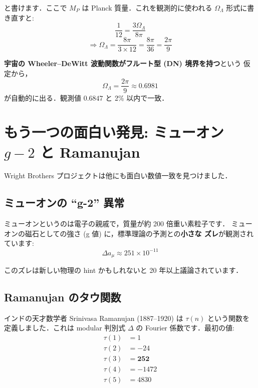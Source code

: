 \documentclass[11pt,a4paper]{article}
\begin{document}
と書けます．ここで $M_P$ は Planck 質量．これを観測的に使われる
$\Omega_\Lambda$ 形式に書き直すと:
\begin{equation*}
\frac{1}{12} = \frac{3 \Omega_\Lambda}{8\pi}
\end{equation*}
\begin{equation*}
\Longrightarrow \Omega_\Lambda = \frac{8\pi}{3 \times 12} = \frac{8\pi}{36} = \frac{2\pi}{9}
\end{equation*}

\begin{tcolorbox}[colback=green!5,colframe=green!60!black,title=導出完了]
\textbf{宇宙の Wheeler--DeWitt 波動関数がフルート型 (DN) 境界を持つ}という
仮定から，
\begin{equation*}
\boxed{\Omega_\Lambda = \frac{2\pi}{9} \approx 0.6981}
\end{equation*}
が自動的に出る．観測値 $0.6847$ と 2\% 以内で一致．
\end{tcolorbox}

\section{もう一つの面白い発見: ミューオン $g-2$ と Ramanujan}

Wright Brothers プロジェクトは他にも面白い数値一致を見つけました．

\subsection{ミューオンの ``g-2'' 異常}

ミューオンというのは電子の親戚で，質量が約 200 倍重い素粒子です．
ミューオンの磁石としての強さ (g 値) に，標準理論の予測との\textbf{小さな
ズレ}が観測されています:
\begin{equation*}
\Delta a_\mu \approx 251 \times 10^{-11}
\end{equation*}

このズレは新しい物理の hint かもしれないと 20 年以上議論されています．

\subsection{Ramanujan のタウ関数}

インドの天才数学者 Srinivasa Ramanujan (1887--1920) は
$\tau(n)$ という関数を定義しました．これは modular 判別式 $\Delta$ の
Fourier 係数です．最初の値:
\begin{align*}
\tau(1) &= 1\\
\tau(2) &= -24\\
\tau(3) &= \mathbf{252}\\
\tau(4) &= -1472\\
\tau(5) &= 4830
\end{align*}
\end{document}
